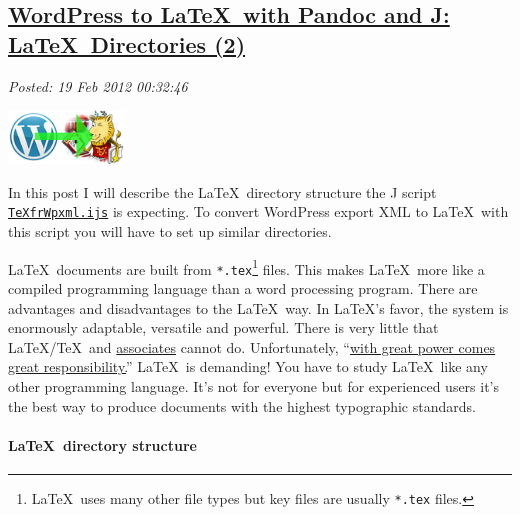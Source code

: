 %

\subsection*{\href{http://bakerjd99.wordpress.com/2012/02/18/wordpress-to-latex-with-pandoc-and-j-latex-directories-part-2-2/}{WordPress to \LaTeX\ with Pandoc and J: \LaTeX\ Directories (2)}}


\noindent\emph{Posted: 19 Feb 2012 00:32:46}
\vspace{6pt}

\captionsetup[floatingfigure]{labelformat=empty}
\begin{floatingfigure}[r]{0.25\textwidth}
\centering
\includegraphics[width=0.23\textwidth]{i-mNK4RHL-M.png}
\caption{WordPress to \LaTeX}
\label{fig:2374X0}
\end{floatingfigure}In this post I will describe the \LaTeX\ directory structure the J script
\href{http://www.box.com/s/9v5b6ub9cya108c03mr7}{\texttt{TeXfrWpxml.ijs}}
is expecting. To convert WordPress export XML to \LaTeX\ with this script
you will have to set up similar directories.

\LaTeX\ documents are built from \texttt{*.tex}\footnote{
\LaTeX\ uses many other file types but key files
are usually \texttt{*.tex} files.
} files.
This makes \LaTeX\ more like a compiled programming language than a word
processing program. There are advantages and disadvantages to the \LaTeX\
way. In \LaTeX's favor, the system is enormously adaptable, versatile and
powerful. There is very little that \LaTeX/\TeX\ and
\href{http://www.amazon.com/LaTeX-Companions-Third-Revised-Boxed/dp/0321514432}{associates}
cannot do. Unfortunately,
``\href{http://www.youtube.com/watch?v=IKmQW7JTb6s}{with great power
comes great responsibility.}'' \LaTeX\ is demanding! You have to study
\LaTeX\ like any other programming language. It's not for everyone but for
experienced users it's the best way to produce documents with the
highest typographic standards.

\paragraph{\LaTeX\ directory structure}

